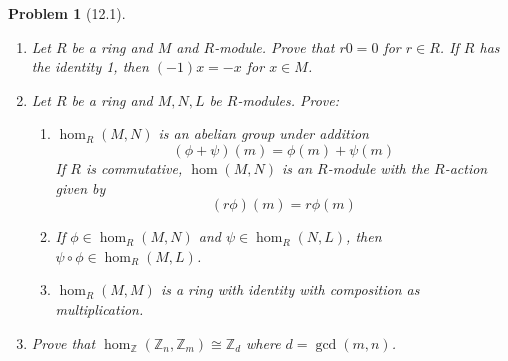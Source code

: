 \documentclass[10pt]{article}
\newcommand{\bb}[1]{\mathbb{#1}}
\theoremstyle{plain}
\newtheorem{problem}{Problem}
\theoremstyle{remark}
\begin{document}
\begin{problem}[12.1]
  \begin{enumerate}
  \item Let $R$ be a ring and $M$ and $R$-module. Prove that $r0=0$
    for $r\in R$. If $R$ has the identity 1, then $(-1)x=-x$ for $x\in M$.
  \item Let $R$ be a ring and $M,N,L$ be $R$-modules. Prove:
    \begin{enumerate}
    \item $\hom_R(M,N)$ is an abelian group under addition
      \[ (\phi+\psi)(m)=\phi(m)+\psi(m) \]
      If $R$ is commutative, $\hom(M,N)$ is an $R$-module with the $R$-action
      given by
      \[ (r\phi)(m)=r\phi(m)\]
    \item If $\phi\in\hom_R(M,N)$ and $\psi\in\hom_R(N,L)$, then $\psi\circ\phi\in\hom_R(M,L)$.
    \item $\hom_R(M,M)$ is a ring with identity with composition as
      multiplication.
    \end{enumerate}
  \item Prove that $\hom_{\bb{Z}}(\bb{Z}_n,\bb{Z}_m)\cong\bb{Z}_d$ where
    $d=\gcd(m,n)$.
  \end{enumerate}
\end{problem}
\end{document}
